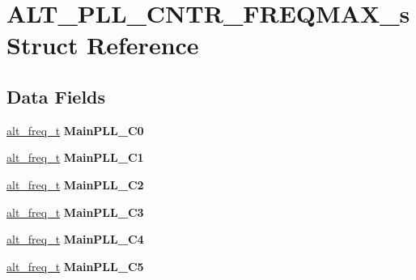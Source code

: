 \hypertarget{structALT__PLL__CNTR__FREQMAX__s}{}\section{A\+L\+T\+\_\+\+P\+L\+L\+\_\+\+C\+N\+T\+R\+\_\+\+F\+R\+E\+Q\+M\+A\+X\+\_\+s Struct Reference}
\label{structALT__PLL__CNTR__FREQMAX__s}
\subsection*{Data Fields}
\begin{DoxyCompactItemize}
\item 
\mbox{\label{structALT__PLL__CNTR__FREQMAX__s_aad9825178d62b52cc4e85cd5f07b3e30}} 
\mbox{\hyperlink{group__CLK__MGR_gaa32fe6dfaa6def16098e0039eb336383}{alt\+\_\+freq\+\_\+t}} {\bfseries Main\+P\+L\+L\+\_\+\+C0}
\item 
\mbox{\label{structALT__PLL__CNTR__FREQMAX__s_a9e30b947567b71c3c30265a6c4fcf7d5}} 
\mbox{\hyperlink{group__CLK__MGR_gaa32fe6dfaa6def16098e0039eb336383}{alt\+\_\+freq\+\_\+t}} {\bfseries Main\+P\+L\+L\+\_\+\+C1}
\item 
\mbox{\label{structALT__PLL__CNTR__FREQMAX__s_a275de32814c7a78390e44135935d5948}} 
\mbox{\hyperlink{group__CLK__MGR_gaa32fe6dfaa6def16098e0039eb336383}{alt\+\_\+freq\+\_\+t}} {\bfseries Main\+P\+L\+L\+\_\+\+C2}
\item 
\mbox{\label{structALT__PLL__CNTR__FREQMAX__s_a3883ff07ba55d16b308cac6bfb569a75}} 
\mbox{\hyperlink{group__CLK__MGR_gaa32fe6dfaa6def16098e0039eb336383}{alt\+\_\+freq\+\_\+t}} {\bfseries Main\+P\+L\+L\+\_\+\+C3}
\item 
\mbox{\label{structALT__PLL__CNTR__FREQMAX__s_a51bcfb1c035d0bdfdf7b646166a80101}} 
\mbox{\hyperlink{group__CLK__MGR_gaa32fe6dfaa6def16098e0039eb336383}{alt\+\_\+freq\+\_\+t}} {\bfseries Main\+P\+L\+L\+\_\+\+C4}
\item 
\mbox{\label{structALT__PLL__CNTR__FREQMAX__s_ae9149742e4f4d556698be8c0c72dbfc0}} 
\mbox{\hyperlink{group__CLK__MGR_gaa32fe6dfaa6def16098e0039eb336383}{alt\+\_\+freq\+\_\+t}} {\bfseries Main\+P\+L\+L\+\_\+\+C5}

\end{DoxyCompactItemize}
